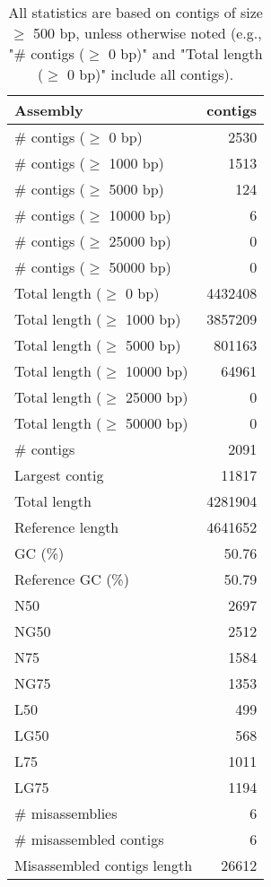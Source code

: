 \documentclass[12pt,a4paper]{article}
\begin{document}
\begin{table}[ht]
\begin{center}
\caption{All statistics are based on contigs of size $\geq$ 500 bp, unless otherwise noted (e.g., "\# contigs ($\geq$ 0 bp)" and "Total length ($\geq$ 0 bp)" include all contigs).}
\begin{tabular}{|l*{1}{|r}|}
\hline
Assembly & contigs \\ \hline
\# contigs ($\geq$ 0 bp) & 2530 \\ \hline
\# contigs ($\geq$ 1000 bp) & 1513 \\ \hline
\# contigs ($\geq$ 5000 bp) & 124 \\ \hline
\# contigs ($\geq$ 10000 bp) & 6 \\ \hline
\# contigs ($\geq$ 25000 bp) & 0 \\ \hline
\# contigs ($\geq$ 50000 bp) & 0 \\ \hline
Total length ($\geq$ 0 bp) & 4432408 \\ \hline
Total length ($\geq$ 1000 bp) & 3857209 \\ \hline
Total length ($\geq$ 5000 bp) & 801163 \\ \hline
Total length ($\geq$ 10000 bp) & 64961 \\ \hline
Total length ($\geq$ 25000 bp) & 0 \\ \hline
Total length ($\geq$ 50000 bp) & 0 \\ \hline
\# contigs & 2091 \\ \hline
Largest contig & 11817 \\ \hline
Total length & 4281904 \\ \hline
Reference length & 4641652 \\ \hline
GC (\%) & 50.76 \\ \hline
Reference GC (\%) & 50.79 \\ \hline
N50 & 2697 \\ \hline
NG50 & 2512 \\ \hline
N75 & 1584 \\ \hline
NG75 & 1353 \\ \hline
L50 & 499 \\ \hline
LG50 & 568 \\ \hline
L75 & 1011 \\ \hline
LG75 & 1194 \\ \hline
\# misassemblies & 6 \\ \hline
\# misassembled contigs & 6 \\ \hline
Misassembled contigs length & 26612 \\ \hline

\end{tabular}
\end{center}
\end{table}
\end{document}
